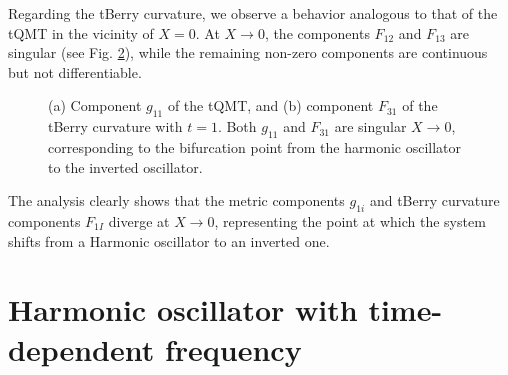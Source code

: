 \documentclass[12pt]{iopart}
\begin{document}
Regarding the tBerry curvature, we observe a behavior analogous to that of the tQMT in the vicinity of $X=0$. At $X\to 0$, the components $F_{12}$ and $F_{13}$ are singular  (see Fig. \ref{fig:fvariandoXb}), while the remaining non-zero components are continuous but not differentiable.

\begin{figure}[H]
  \centering
  \begin{subfigure}{0.45\linewidth}
    \caption{}
    \label{fig:gvariandoXa}
  \end{subfigure}
  \begin{subfigure}{0.45\linewidth}
    \caption{}
    \label{fig:fvariandoXb}  
  \end{subfigure}
  \captionsetup{font=small} 
  \caption{\justifying (a) Component $g_{11}$ of the tQMT, and (b) component $F_{31}$ of the tBerry curvature with $t=1$. Both $g_{11}$ and $F_{31}$ are singular $X\to 0$, corresponding to the bifurcation point from the harmonic oscillator to the inverted oscillator.}
    \label{fig:fvariandoX}
\end{figure}

The analysis clearly shows that the metric components $g_{1i}$ and tBerry curvature components $F_{1I}$ diverge at $X\to 0$, representing the point at which the system shifts from a Harmonic oscillator to an inverted one.





\section{Harmonic oscillator with time-dependent frequency}\label{secHOTDF}
\end{document}

